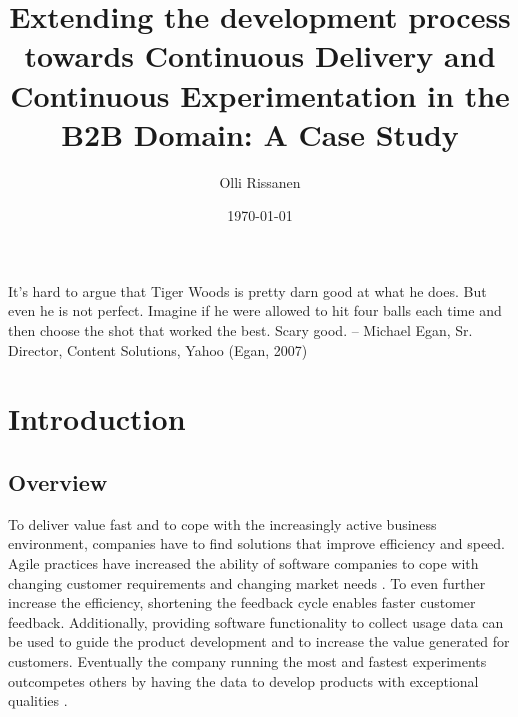 \documentclass[english, grading]{tktltiki2}
\title{Extending the development process towards Continuous Delivery and Continuous Experimentation in the B2B Domain: A Case Study}
\author{Olli Rissanen}
\date{\today}
\theoremstyle{definition}
\theoremstyle{remark}
\begin{document}

\frontmatter      %

\maketitle        %
\makeabstract     %

\tableofcontents  %

\newpage
\listoffigures
\listoftables

\newpage

It’s hard to argue that Tiger Woods is pretty darn good at what he does. But even he is not perfect. Imagine if
he were allowed to hit four balls each time and then choose the shot that worked the best. Scary good.
-- Michael Egan, Sr. Director, Content Solutions, Yahoo (Egan, 2007)


\mainmatter       %




\section{Introduction} %

\subsection{Overview}
To deliver value fast and to cope with the increasingly active business environment, companies have to find solutions that improve efficiency and speed. Agile practices \cite{cockburn2002agile} have increased the ability of software companies to cope with changing customer requirements and changing market needs \cite{dzamashvili2010impact}. To even further increase the efficiency, shortening the feedback cycle enables faster customer feedback. Additionally, providing software functionality to collect usage data can be used to guide the product development and to increase the value generated for customers. Eventually the company running the most and fastest experiments outcompetes others by having the data to develop products with exceptional qualities \cite{eklund2012architecture}.
\end{document}
